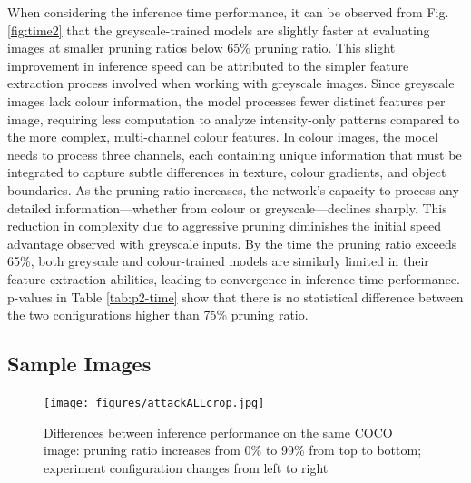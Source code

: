 \documentclass[journal,onecolumn,12pt]{IEEEtran}
\begin{document}
When considering the inference time performance, it can be observed from Fig. \ref{fig:time2} that the greyscale-trained models are slightly faster at evaluating images at smaller pruning ratios below 65\% pruning ratio. This slight improvement in inference speed can be attributed to the simpler feature extraction process involved when working with greyscale images. Since greyscale images lack colour information, the model processes fewer distinct features per image, requiring less computation to analyze intensity-only patterns compared to the more complex, multi-channel colour features. In colour images, the model needs to process three channels, each containing unique information that must be integrated to capture subtle differences in texture, colour gradients, and object boundaries. As the pruning ratio increases, the network's capacity to process any detailed information—whether from colour or greyscale—declines sharply. This reduction in complexity due to aggressive pruning diminishes the initial speed advantage observed with greyscale inputs. By the time the pruning ratio exceeds 65\%, both greyscale and colour-trained models are similarly limited in their feature extraction abilities, leading to convergence in inference time performance. p-values in Table \ref{tab:p2-time} show that there is no statistical difference between the two configurations higher than 75\% pruning ratio.

\subsection{Sample Images}

\begin{figure}
    \centering
    \captionsetup{justification=centering}
    \texttt{[image: figures/attackALLcrop.jpg]}
    \caption*{}
    \caption{Differences between inference performance on the same COCO image: pruning ratio increases from 0\% to 99\% from top to bottom; experiment configuration changes from left to right}
    \label{fig:attackAll}
\end{figure}
\end{document}
